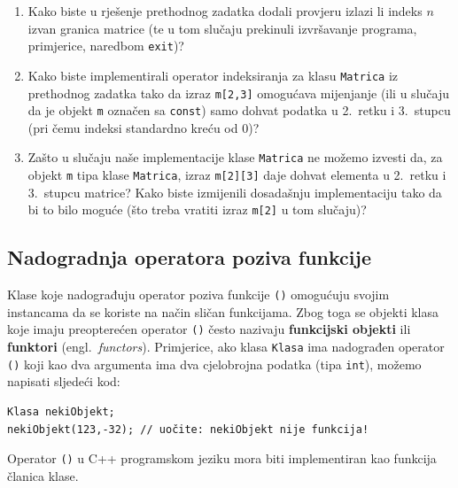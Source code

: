 \begin{razmisljanje}
    \begin{enumerate}
        \item 
        Kako biste u rješenje prethodnog zadatka dodali provjeru
        izlazi li indeks $n$ izvan granica matrice
        (te u tom slučaju prekinuli izvršavanje programa,
        primjerice, naredbom \texttt{exit})?
        \item 
        Kako biste implementirali operator indeksiranja
        za klasu \texttt{Matrica} iz prethodnog zadatka
        tako da izraz 
        \texttt{m[2,3]} omogućava mijenjanje
        (ili u slučaju da je objekt \texttt{m} označen sa \texttt{const})
        samo dohvat podatka u 2.\ retku i 3.\ stupcu
        (pri čemu indeksi standardno kreću od $0$)?
        \item 
        Zašto u slučaju naše implementacije klase \texttt{Matrica} ne možemo
        izvesti da, za objekt \texttt{m} tipa klase \texttt{Matrica},
        izraz \texttt{m[2][3]} daje dohvat elementa u 2.\ retku i 3.\ stupcu matrice?
        Kako biste izmijenili dosadašnju implementaciju
        tako da bi to bilo moguće
        (što treba vratiti izraz \texttt{m[2]} u tom slučaju)?
    \end{enumerate}
\end{razmisljanje}


\subsection{Nadogradnja operatora poziva funkcije}


Klase koje nadograđuju operator poziva funkcije \texttt{()} 
omogućuju svojim instancama da se koriste na način sličan funkcijama.
Zbog toga se objekti klasa koje imaju preopterećen operator \texttt{()} često nazivaju 
\textbf{funkcijski objekti} ili \textbf{funktori} (engl.\ \textit{functors}).
Primjerice, 
ako klasa \texttt{Klasa} ima nadograđen operator \texttt{()}
koji kao dva argumenta ima dva cjelobrojna podatka (tipa \texttt{int}),
možemo napisati sljedeći kod:
\begin{verbatim}
Klasa nekiObjekt;
nekiObjekt(123,-32); // uočite: nekiObjekt nije funkcija!
\end{verbatim}

Operator \texttt{()} u C++ programskom jeziku mora biti implementiran kao funkcija članica klase.


